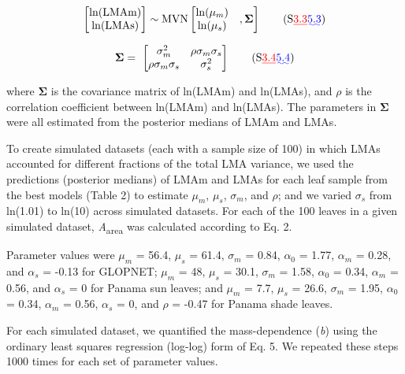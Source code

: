 \documentclass[
  12pt,
  letterpaper,
  DIV=11,
  numbers=noendperiod]{scrartcl}
\providecommand{\DIFadd}[1]{{\protect\color{blue}\uwave{#1}}} %
\providecommand{\DIFdel}[1]{{\protect\color{red}\sout{#1}}}                      %
\providecommand{\DIFaddbegin}{} %
\providecommand{\DIFaddend}{} %
\providecommand{\DIFdelbegin}{} %
\providecommand{\DIFdelend}{} %
\newcommand{\DIFscaledelfig}{0.5}
\newlength{\DIFdelgraphicswidth} %
\newlength{\DIFdelgraphicsheight} %
\newcommand{\DIFaddincludegraphics}[2][]{{\color{blue}\fbox{\DIFOincludegraphics[#1]{#2}}}} %
\newcommand{\DIFdelincludegraphics}[2][]{%
\sbox{\DIFdelgraphicsbox}{\DIFOincludegraphics[#1]{#2}}%
\settoboxwidth{\DIFdelgraphicswidth}{\DIFdelgraphicsbox} %
\settoboxtotalheight{\DIFdelgraphicsheight}{\DIFdelgraphicsbox} %
\scalebox{\DIFscaledelfig}{%
\parbox[b]{\DIFdelgraphicswidth}{\usebox{\DIFdelgraphicsbox}\\[-\baselineskip] \rule{\DIFdelgraphicswidth}{0em}}\llap{\resizebox{\DIFdelgraphicswidth}{\DIFdelgraphicsheight}{%
\setlength{\unitlength}{\DIFdelgraphicswidth}%
\begin{picture}(1,1)%
\thicklines\linethickness{2pt} %
{\color[rgb]{1,0,0}\put(0,0){\framebox(1,1){}}}%
{\color[rgb]{1,0,0}\put(0,0){\line( 1,1){1}}}%
{\color[rgb]{1,0,0}\put(0,1){\line(1,-1){1}}}%
\end{picture}%
}\hspace*{3pt}}} %
} %
\DeclareRobustCommand{\DIFaddbegin}{\DIFOaddbegin \let\includegraphics\DIFaddincludegraphics} %
\DeclareRobustCommand{\DIFaddend}{\DIFOaddend \let\includegraphics\DIFOincludegraphics} %
\DeclareRobustCommand{\DIFdelbegin}{\DIFOdelbegin \let\includegraphics\DIFdelincludegraphics} %
\DeclareRobustCommand{\DIFdelend}{\DIFOaddend \let\includegraphics\DIFOincludegraphics} %
\begin{document}
\[
\begin{bmatrix}
\mathrm{ln}(\mathrm{LMAm})\\
\mathrm{ln}(\mathrm{LMAs})
\end{bmatrix}
\sim \mathrm{MVN}
\left[
\begin{matrix}
\ln(\mu_{m}) &\\
\ln(\mu_{s}) &
\end{matrix},
\boldsymbol{\Sigma}
\right] \qquad(\mathrm{S}\DIFdelbegin \DIFdel{3.3}\DIFdelend \DIFaddbegin \DIFadd{5.3}\DIFaddend )
\]

\[
\boldsymbol{\Sigma} = \
\begin{bmatrix}
\sigma_m^2 & \rho \sigma_m \sigma_s \\
\rho \sigma_m \sigma_s & \sigma_s^2 \\
\end{bmatrix} \qquad(\mathrm{S}\DIFdelbegin \DIFdel{3.4}\DIFdelend \DIFaddbegin \DIFadd{5.4}\DIFaddend )
\]

where \(\boldsymbol{\Sigma}\) is the covariance matrix of ln(LMAm) and
ln(LMAs), and \(\rho\) is the correlation coefficient between ln(LMAm)
and ln(LMAs). The parameters in \(\boldsymbol{\Sigma}\) were all
estimated from the posterior medians of LMAm and LMAs.

To create simulated datasets (each with a sample size of 100) in which
LMAs accounted for different fractions of the total LMA variance, we
used the predictions (posterior medians) of LMAm and LMAs for each leaf
sample from the best models (Table 2) to estimate \(\mu_m\), \(\mu_s\),
\(\sigma_m\), and \(\rho\); and we varied \(\sigma_s\) from ln(1.01) to
ln(10) across simulated datasets. For each of the 100 leaves in a given
simulated dataset, \emph{A}\textsubscript{area} was calculated according
to Eq. 2.

Parameter values were \(\mu_m\) = 56.4, \(\mu_s\) = 61.4, \(\sigma_m\) =
0.84, \(\alpha_0\) = 1.77, \(\alpha_m\) = 0.28, and \(\alpha_s\) = -0.13
for GLOPNET; \(\mu_m\) = 48, \(\mu_s\) = 30.1, \(\sigma_m\) = 1.58,
\(\alpha_0\) = 0.34, \(\alpha_m\) = 0.56, and \(\alpha_s\) = 0 for
Panama sun leaves; and \(\mu_m\) = 7.7, \(\mu_s\) = 26.6, \(\sigma_m\) =
1.95, \(\alpha_0\) = 0.34, \(\alpha_m\) = 0.56, \(\alpha_s\) = 0, and
\(\rho\) = -0.47 for Panama shade leaves.

For each simulated dataset, we quantified the mass-dependence (\emph{b})
using the ordinary least squares regression (log-log) form of Eq. 5. We
repeated these steps 1000 times for each set of parameter values.
\end{document}
